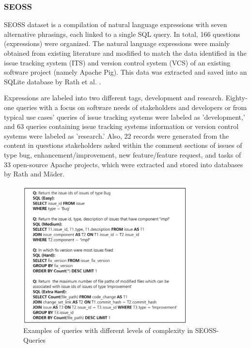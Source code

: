 \subsubsection{SEOSS}

\ac{SEOSS} dataset is a compilation of natural language expressions with seven alternative phrasings, each linked to a single SQL query. In total, 166 questions (expressions) were organized. The natural language expressions were mainly obtained from existing literature and modified to match the data identified in the issue tracking system (ITS) and version control system (VCS) of an existing software project (namely Apache Pig). This data was extracted and saved into an SQLite database by Rath et al. \cite{RATH2019104005}.

Expressions are labeled into two different tags, development and research. Eighty-one queries with a focus on software needs of stakeholders and developers or from typical use cases' queries of issue tracking systems were labeled as 'development,' and 63 queries containing issue tracking systems information or version control systems were labeled as 'research.' Also, 22 records were generated from the content in questions stakeholders asked within the comment sections of issues of type bug, enhancement/improvement, new feature/feature request, and tasks of 33 open-source Apache projects, which were extracted and stored into databases by Rath and Mäder\cite{RATH2019104005}.


\begin{figure}[htb]
    \centering
    \includegraphics[width=0.8\textwidth]{pics/seoss/seoss.png}
    \caption{\small Examples of queries with different levels of complexity in SEOSS-Queries \cite{TOMOVA2022108211}}
    \label{fig:SESS2}
\end{figure}

